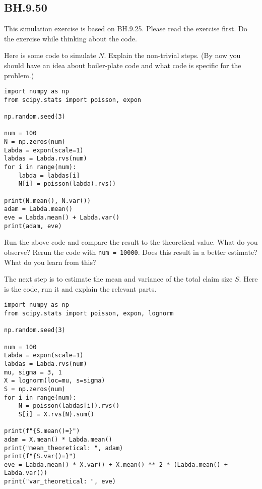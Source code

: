 

\subsection{BH.9.50}

This simulation exercise is based on BH.9.25.  Please read the exercise first. Do the exercise while thinking about the code.

\begin{exercise}
Here is some code to simulate $N$.  Explain the non-trivial steps. (By now you should have an idea about boiler-plate code and what code is specific for the problem.)

\begin{verbatim}
import numpy as np
from scipy.stats import poisson, expon

np.random.seed(3)

num = 100
N = np.zeros(num)
Labda = expon(scale=1)
labdas = Labda.rvs(num)
for i in range(num):
    labda = labdas[i]
    N[i] = poisson(labda).rvs()

print(N.mean(), N.var())
adam = Labda.mean()
eve = Labda.mean() + Labda.var()
print(adam, eve)
\end{verbatim}
\end{exercise}

\begin{exercise}
Run the above code and compare the result to the theoretical value. What do you observe? Rerun the code with \texttt{num = 10000}. Does this result in a better estimate? What do you learn from this?
\end{exercise}

\begin{exercise}
The next step is to estimate the mean and variance of the total claim size $S$.
Here is the code, run it and explain the relevant parts.
\begin{verbatim}
import numpy as np
from scipy.stats import poisson, expon, lognorm

np.random.seed(3)

num = 100
Labda = expon(scale=1)
labdas = Labda.rvs(num)
mu, sigma = 3, 1
X = lognorm(loc=mu, s=sigma)
S = np.zeros(num)
for i in range(num):
    N = poisson(labdas[i]).rvs()
    S[i] = X.rvs(N).sum()

print(f"{S.mean()=}")
adam = X.mean() * Labda.mean()
print("mean_theoretical: ", adam)
print(f"{S.var()=}")
eve = Labda.mean() * X.var() + X.mean() ** 2 * (Labda.mean() + Labda.var())
print("var_theoretical: ", eve)
\end{verbatim}
\end{exercise}

